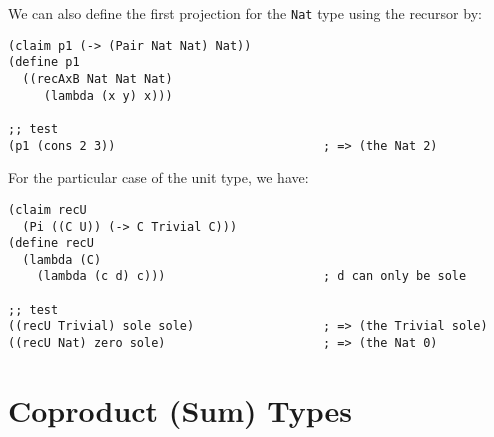We can also define the first projection for the \texttt{Nat} type
using the recursor by:
{
  \small
\begin{verbatim}
(claim p1 (-> (Pair Nat Nat) Nat))
(define p1
  ((recAxB Nat Nat Nat)
     (lambda (x y) x)))

;; test
(p1 (cons 2 3))                             ; => (the Nat 2)
\end{verbatim}
}

For the particular case of the unit type, we have:
{
  \small
\begin{verbatim}
(claim recU
  (Pi ((C U)) (-> C Trivial C)))
(define recU
  (lambda (C)
    (lambda (c d) c)))                      ; d can only be sole

;; test
((recU Trivial) sole sole)                  ; => (the Trivial sole)
((recU Nat) zero sole)                      ; => (the Nat 0)
\end{verbatim}
}




\section{Coproduct (Sum) Types}
\label{sec:coprod}

